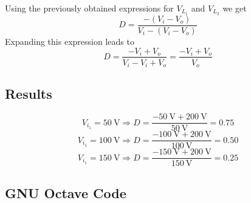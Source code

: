 Using the previously obtained expressions for $V_{L_{1}}$ and
$V_{L_{2}}$ we get
\[  D = \frac{-(V_i - V_o)}{V_i - (V_i - V_o)} \]
Expanding this expression leads to
\[ D = \frac{- V_i + V_o}{V_i - V_i + V_o} = \frac{- V_i + V_o}{V_o} \]

\subsection{Results}
\[ V_{i_{1}} = \SI{50}{\volt}  \Rightarrow D = \frac{- \SI{50}{\volt}  + \SI{200}{\volt}}{\SI{50}{\volt}}  = 0.75 \]
\[ V_{i_{1}} = \SI{100}{\volt} \Rightarrow D = \frac{- \SI{100}{\volt} + \SI{200}{\volt}}{\SI{100}{\volt}} = 0.50 \]
\[ V_{i_{1}} = \SI{150}{\volt} \Rightarrow D = \frac{- \SI{150}{\volt} + \SI{200}{\volt}}{\SI{150}{\volt}} = 0.25 \]

\clearpage
\subsection{GNU Octave Code}


\clearpage
